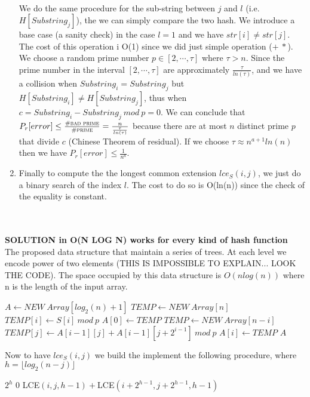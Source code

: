 \documentclass[a4paper]{article}
\begin{document}
\begin{enumerate}
\begin{align*}
\end{align*}
We do the same procedure for the sub-string between $j$ and $l$ (i.e. $H[Substring_j]$), the we can simply compare the two hash. We introduce a base case (a sanity check) in the case $l=1$ and we have $str[i] \neq str[j]$. The cost of this operation i O(1) since we did just simple operation ($+ \ *$).\\
We choose a random prime number $p\in [2,\cdots,\tau]$ where $\tau > n$. Since the prime number in the interval $[2,\cdots,\tau]$ are approximately $ \frac{\tau}{ln(\tau)}$, and we have a collision when $Substring_i=Substring_j$ but $H[Substring_i]\neq H[Substring_j]$, thus when $c= Substring_i- Substring_j \ mod \ p=0$. We can conclude that $P_r[error] \leq \frac{\textsc{\#bad prime}}{\textsc{\#prime}}= \frac{n}{\frac{\tau}{ln(\tau)}}$ because there are at most $n$ distinct prime $p$ that divide $c$ (Chinese Theorem of residual). If we choose $\tau \approx n^{a+1} ln(n)$ then we have $P_r[error] \leq \frac{1}{n^a}$.
\item Finally to compute the the longest common extension $lce_S(i, j)$, we just do a binary search of the index $l$. The cost to do so is O(ln(n)) since the check of the equality is constant.
\end{enumerate}
\fi
\newpage \qquad \\
\\
\textbf{SOLUTION in O(N LOG N) works for every kind of hash function}
\\
The proposed data structure that maintain a series of trees. At each level we encode power of two elements (THIS IS IMPOSSIBLE TO EXPLAIN... LOOK THE CODE). The space occupied by this data structure is $O(nlog(n))$ where n is the length of the input array.   
\begin{algorithmic}
\State $A \gets NEW \ Array[log_2(n)+1]$
\State $TEMP \gets NEW \ Array[n]$
\State $TEMP[i] \gets S[i] \ mod \ p$
\EndFor 
\State $A[0] \gets TEMP$
\State $TEMP \gets NEW \ Array[n-i]$ 
\State $TEMP[j] \gets A[i-1][j] + A[i-1][j+2^{i-1}] \ mod \ p$
\EndFor 
\State $A[i] \gets TEMP$
\EndFor 
\State \Return $A$
\EndFunction
\end{algorithmic}
Now to have $lce_S(i, j)$ we build the implement the following procedure, where $h=\lfloor log_2(n-j)\rfloor$
\begin{algorithmic}
    \State \Return $2^h$
\Else
        \State \Return $0$
    \Else
    	\State \Return LCE$(i, j,h-1) +$LCE$(i+2^{h-1},j+2^{h-1},h-1)$ 
    \EndIf
\EndIf
\EndFunction
\end{algorithmic}
\end{document}
